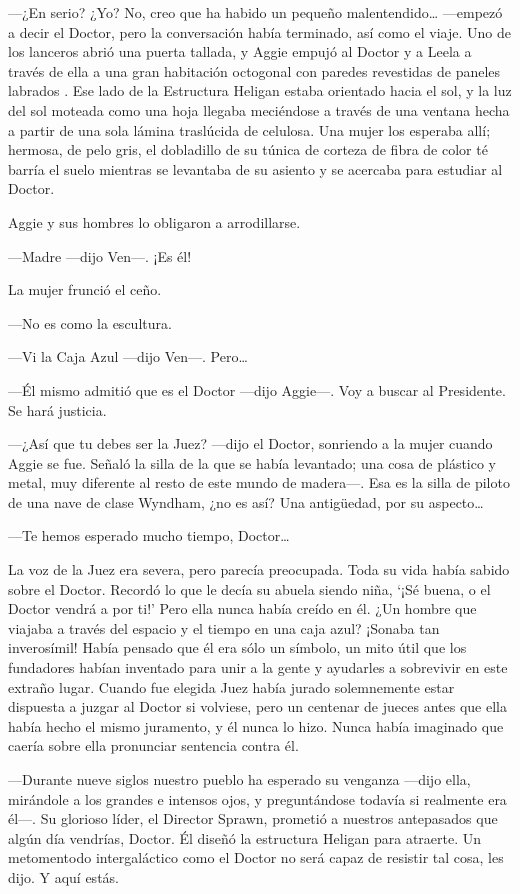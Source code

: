 ---¿En serio? ¿Yo? No, creo que ha habido un pequeño
malentendido\ldots{} ---empezó a decir el Doctor, pero la conversación
había terminado, así como el viaje. Uno de los lanceros abrió una puerta
tallada, y Aggie empujó al Doctor y a Leela a través de ella a una gran
habitación octogonal con paredes revestidas de paneles labrados . Ese
lado de la Estructura Heligan estaba orientado hacia el sol, y la luz
del sol moteada como una hoja llegaba meciéndose a través de una ventana
hecha a partir de una sola lámina traslúcida de celulosa. Una mujer los
esperaba allí; hermosa, de pelo gris, el dobladillo de su túnica de
corteza de fibra de color té barría el suelo mientras se levantaba de su
asiento y se acercaba para estudiar al Doctor.

Aggie y sus hombres lo obligaron a arrodillarse.

---Madre ---dijo Ven---. ¡Es él!

La mujer frunció el ceño.

---No es como la escultura.

---Vi la Caja Azul ---dijo Ven---. Pero\ldots{}

---Él mismo admitió que es el Doctor ---dijo Aggie---. Voy a buscar al
Presidente. Se hará justicia.

---¿Así que tu debes ser la Juez? ---dijo el Doctor, sonriendo a la
mujer cuando Aggie se fue. Señaló la silla de la que se había levantado;
una cosa de plástico y metal, muy diferente al resto de este mundo de
madera---. Esa es la silla de piloto de una nave de clase Wyndham, ¿no
es así? Una antigüedad, por su aspecto\ldots{}

---Te hemos esperado mucho tiempo, Doctor\ldots{}

La voz de la Juez era severa, pero parecía preocupada. Toda su vida
había sabido sobre el Doctor. Recordó lo que le decía su abuela siendo
niña, `¡Sé buena, o el Doctor vendrá a por ti!' Pero ella nunca había
creído en él. ¿Un hombre que viajaba a través del espacio y el tiempo en
una caja azul? ¡Sonaba tan inverosímil! Había pensado que él era sólo un
símbolo, un mito útil que los fundadores habían inventado para unir a la
gente y ayudarles a sobrevivir en este extraño lugar. Cuando fue elegida
Juez había jurado solemnemente estar dispuesta a juzgar al Doctor si
volviese, pero un centenar de jueces antes que ella había hecho el mismo
juramento, y él nunca lo hizo. Nunca había imaginado que caería sobre
ella pronunciar sentencia contra él.

---Durante nueve siglos nuestro pueblo ha esperado su venganza ---dijo
ella, mirándole a los grandes e intensos ojos, y preguntándose todavía
si realmente era él---. Su glorioso líder, el Director Sprawn, prometió
a nuestros antepasados que algún día vendrías, Doctor. Él diseñó la
estructura Heligan para atraerte. Un metomentodo intergaláctico como el
Doctor no será capaz de resistir tal cosa, les dijo. Y aquí estás.

